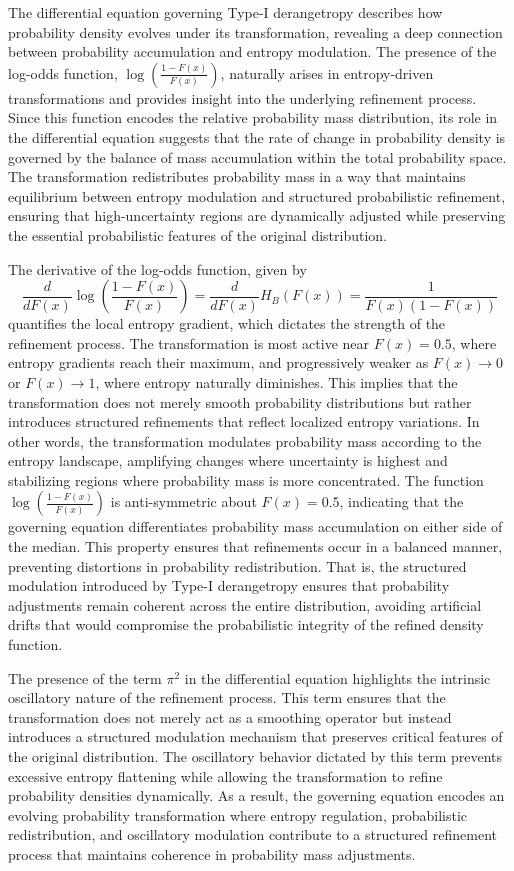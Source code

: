 \documentclass[sn-mathphys-num]{sn-jnl}%
\theoremstyle{thmstyleone}%
\theoremstyle{thmstyletwo}%
\theoremstyle{thmstylethree}%
\begin{document}
The differential equation governing Type-I derangetropy describes how probability density evolves under its transformation, revealing a deep connection between probability accumulation and entropy modulation. The presence of the log-odds function, $\log \left(\frac{1-F(x)}{F(x)}\right)$, naturally arises in entropy-driven transformations and provides insight into the underlying refinement process. Since this function encodes the relative probability mass distribution, its role in the differential equation suggests that the rate of change in probability density is governed by the balance of mass accumulation within the total probability space. The transformation redistributes probability mass in a way that maintains equilibrium between entropy modulation and structured probabilistic refinement, ensuring that high-uncertainty regions are dynamically adjusted while preserving the essential probabilistic features of the original distribution.

The derivative of the log-odds function, given by
\begin{equation}
	\frac{d}{d F(x)} \log \left(\frac{1-F(x)}{F(x)}\right)=\frac{d}{d F(x)} H_B(F(x))=\frac{1}{F(x)(1-F(x))}
\end{equation}
quantifies the local entropy gradient, which dictates the strength of the refinement process. The transformation is most active near $F(x)=0.5$, where entropy gradients reach their maximum, and progressively weaker as $F(x) \rightarrow 0$ or $F(x) \rightarrow 1$, where entropy naturally diminishes. This implies that the transformation does not merely smooth probability distributions but rather introduces structured refinements that reflect localized entropy variations. In other words, the transformation modulates probability mass according to the entropy landscape, amplifying changes where uncertainty is highest and stabilizing regions where probability mass is more concentrated. The function $\log \left(\frac{1-F(x)}{F(x)}\right)$ is anti-symmetric about $F(x)=0.5$, indicating that the governing equation differentiates probability mass accumulation on either side of the median. This property ensures that refinements occur in a balanced manner, preventing distortions in probability redistribution. That is, the structured modulation introduced by Type-I derangetropy ensures that probability adjustments remain coherent across the entire distribution, avoiding artificial drifts that would compromise the probabilistic integrity of the refined density function.

The presence of the term $\pi^2$ in the differential equation highlights the intrinsic oscillatory nature of the refinement process. This term ensures that the transformation does not merely act as a smoothing operator but instead introduces a structured modulation mechanism that preserves critical features of the original distribution. The oscillatory behavior dictated by this term prevents excessive entropy flattening while allowing the transformation to refine probability densities dynamically. As a result, the governing equation encodes an evolving probability transformation where entropy regulation, probabilistic redistribution, and oscillatory modulation contribute to a structured refinement process that maintains coherence in probability mass adjustments.
\end{document}
